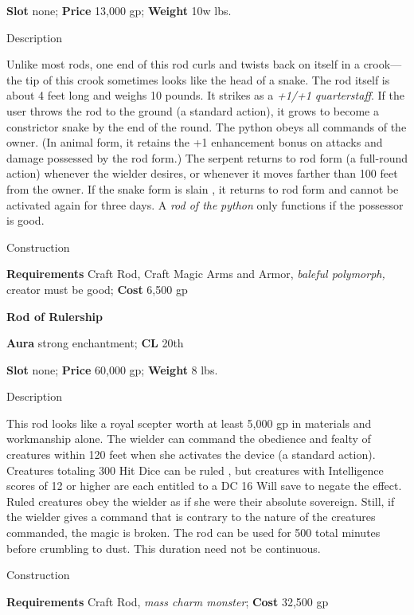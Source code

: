 \textbf{Slot} none; \textbf{Price} 13,000 gp; \textbf{Weight} 10w lbs.
				
Description
				
Unlike most rods, one end of this rod curls and twists back on itself in a crook---the tip of this crook sometimes looks like the head of a snake. The rod itself is about 4 feet long and weighs 10 pounds. It strikes as a \textit{+1/+1 quarterstaff}. If the user throws the rod to the ground (a standard action), it grows to become a constrictor snake by the end of the round. The python obeys all commands of the owner. (In animal form, it retains the +1 enhancement bonus on attacks and damage possessed by the rod form.) The serpent returns to rod form (a full-round action) whenever the wielder desires, or whenever it moves farther than 100 feet from the owner. If the snake form 
is slain
, it returns to rod form and cannot be activated again for three days. A \textit{rod of the} \textit{python }only functions if the possessor is good. 
				
Construction
				
\textbf{Requirements} Craft Rod, Craft Magic Arms and Armor, \textit{baleful polymorph,} creator must be good; \textbf{Cost }6,500 gp
				
\textbf{Rod of Rulership}
				
\textbf{Aura} strong enchantment;\textbf{ CL }20th
				
\textbf{Slot} none; \textbf{Price} 60,000 gp; \textbf{Weight} 8 lbs.
				
Description
				
This rod looks like a royal scepter worth at least 5,000 gp in materials and workmanship alone. The wielder can command the obedience and fealty of creatures within 120 feet when she activates the device (a standard action). Creatures totaling 300 Hit Dice 
can be ruled
, but creatures with Intelligence scores of 12 or higher are each entitled to a DC 16 Will save to negate the effect. Ruled creatures obey the wielder as if she were their absolute sovereign. Still, if the wielder gives a command that is contrary to the nature of the creatures commanded, the magic is broken. The rod 
can be used
 for 500 total minutes before crumbling to dust. This duration need not be continuous. 
				
Construction
				
\textbf{Requirements} Craft Rod, \textit{mass charm monster}; \textbf{Cost }32,500 gp
				
